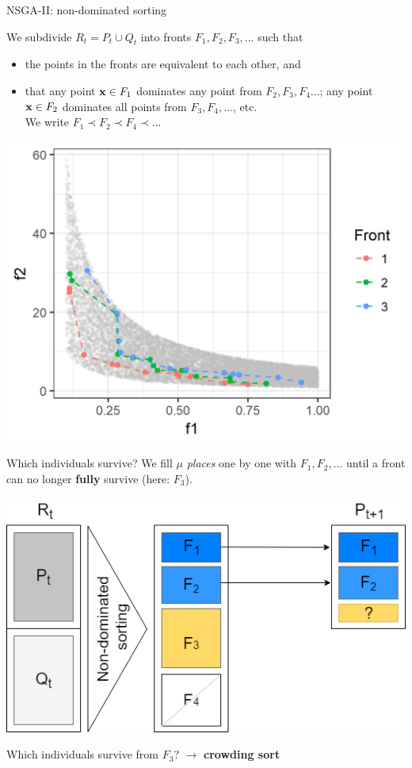 \begin{frame}[allowframebreaks]{NSGA-II: non-dominated sorting}



\begin{footnotesize}
We subdivide $R_t = P_t \cup Q_t$ into fronts $F_1, F_2, F_3, ...$ such that

\begin{itemize}
\item the points in the fronts are equivalent to each other, and
\item that any point $\mathbf{x} \in F_1$ dominates any point from $F_2, F_3, F_4...$; any point $\mathbf{x} \in F_2$ dominates all points from $F_3, F_4, ...$, etc. \\
We write $F_1 \prec F_2 \prec F_4 \prec ... $
\end{itemize}
\end{footnotesize}

\begin{center}
\includegraphics[width = 0.4\linewidth]{images/NSGA2_NDS.png}
\end{center}

\framebreak

Which individuals survive? We fill $\mu$ \textit{places} one by one with $F_1, F_2, ...$ until a front can no longer \textbf{fully} survive (here: $F_3$).

\begin{center}
\includegraphics[width = 0.45\linewidth]{images/NSGA2_2.png}
\end{center}

Which individuals survive from $F_3$? $\to$ \textbf{crowding sort}

\end{frame}

